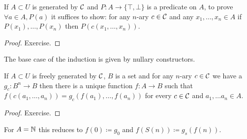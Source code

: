 \begin{boxthe}
\begin{thm}
    If $A \subset U$ is generated by $\mathcal{C}$ and $P \colon A \to \{ \top, \bot\}$ is a predicate on $A$, to prove $\forall a \in A, P(a)$ it suffices to show: for any $n$-ary $c \in \mathcal{C}$ and any $x_1, \dots, x_n \in A$ if $P(x_1), \dots, P(x_n)$ then $P(c(x_1, \dots, x_n))$.
\end{thm}
\end{boxthe}
\begin{proof}
    Exercise.
\end{proof}

\begin{rem}
    The base case of the induction is given by nullary constructors.
\end{rem}

\begin{boxthe}
\begin{thm}
    If $A \subset U$ is freely generated by $\mathcal{C}$, $B$ is a set and for any $n$-ary $c \in \mathcal{C}$ we have a $g_c \colon B^n \to B$ then there is a unique function $f \colon A \to B$ such that $f(c(a_1, \dots, a_n)) = g_c(f(a_1), \dots, f(a_n))$ for every $c \in \mathcal{C}$ and $a_1, \dots a_n \in A$. 
\end{thm}
\end{boxthe}
\begin{proof}
Exercise.
\end{proof}

\begin{example}
    For $A = \mathbb{N}$ this reduces to $f(0) \coloneq g_0$ and $f(S(n)) \coloneq g_s(f(n))$.
\end{example}